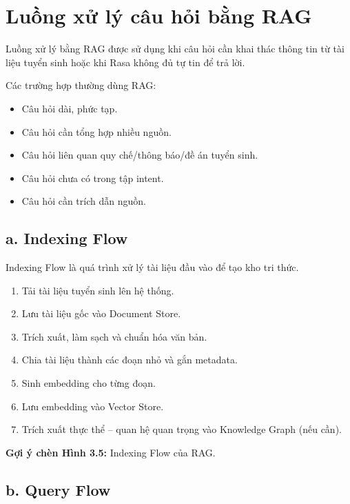 ﻿\section{Luồng xử lý câu hỏi bằng RAG}

Luồng xử lý bằng RAG được sử dụng khi câu hỏi cần khai thác thông tin từ tài liệu tuyển sinh hoặc khi Rasa không đủ tự tin để trả lời.

Các trường hợp thường dùng RAG:
\begin{itemize}
    \item Câu hỏi dài, phức tạp.
    \item Câu hỏi cần tổng hợp nhiều nguồn.
    \item Câu hỏi liên quan quy chế/thông báo/đề án tuyển sinh.
    \item Câu hỏi chưa có trong tập intent.
    \item Câu hỏi cần trích dẫn nguồn.
\end{itemize}

\subsection*{a. Indexing Flow}

Indexing Flow là quá trình xử lý tài liệu đầu vào để tạo kho tri thức.
\begin{enumerate}
    \item Tải tài liệu tuyển sinh lên hệ thống.
    \item Lưu tài liệu gốc vào Document Store.
    \item Trích xuất, làm sạch và chuẩn hóa văn bản.
    \item Chia tài liệu thành các đoạn nhỏ và gắn metadata.
    \item Sinh embedding cho từng đoạn.
    \item Lưu embedding vào Vector Store.
    \item Trích xuất thực thể -- quan hệ quan trọng vào Knowledge Graph (nếu cần).
\end{enumerate}

\textbf{Gợi ý chèn Hình 3.5:} Indexing Flow của RAG.

\subsection*{b. Query Flow}

